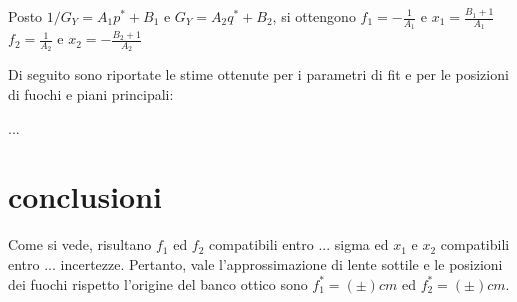\documentclass{article}
\begin{document}
	Posto $1/G_Y = A_1 p^* + B_1$ e $G_Y = A_2 q^* + B_2$, si ottengono 
	$f_1 = -\frac{1}{A_1}$ e $x_1 = \frac{B_1 + 1}{A_1}$
	$f_2 = \frac{1}{A_2}$ e $x_2 = -\frac{B_2 + 1}{A_2}$
	
	
%	
%	

	Di seguito sono riportate le stime ottenute per i parametri di fit e per le posizioni di fuochi e piani principali:
	
	...
	
	
		\section{conclusioni}
	Come si vede, risultano $f_1$ ed $f_2$ compatibili entro ... sigma ed $x_1$ e $x_2$ compatibili entro ... incertezze. Pertanto, vale l'approssimazione di lente sottile e le posizioni dei fuochi rispetto l'origine del banco ottico sono $f^*_1 = (\pm)cm$ ed $f^*_2 = (\pm)cm$.
			
			
			

			
			
			
\end{document}
